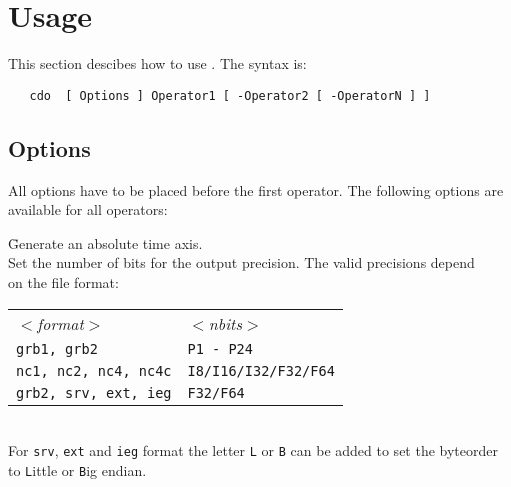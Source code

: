 \section{Usage}

This section descibes how to use {\CDO}.
The syntax is:
\begin{verbatim}
   cdo  [ Options ] Operator1 [ -Operator2 [ -OperatorN ] ]
\end{verbatim}


\subsection{Options}

All options have to be placed before the first operator.
The following options are available for all operators:

\begin{tabbing}
         \= Generate an absolute time axis. \\
         \> Set the number of bits for the output precision. The valid precisions depend \\
         \> on the file format:\\
         \> \parbox[r]{3in}{
              \vspace*{1mm}
              \hspace*{0cm}\begin{tabular}{|l|l|}
              \hline
              \rowcolor{pcolor2}
                \textsl{$<$format$>$} & \textsl{$<$nbits$>$} \\
                \texttt{grb1, grb2}           & \texttt{P1 - P24}              \\
                \texttt{nc1, nc2, nc4, nc4c}  & \texttt{I8/I16/I32/F32/F64}  \\
                \texttt{grb2, srv, ext, ieg}       & \texttt{F32/F64}             \\
              \hline
              \end{tabular}
              \vspace*{1mm}
            } \\
         \> For \texttt{srv}, \texttt{ext} and \texttt{ieg} format the letter \texttt{L} or \texttt{B} can be added to set the byteorder \\
         \> to \texttt{L}ittle or \texttt{B}ig endian. \\

\end{tabbing}
